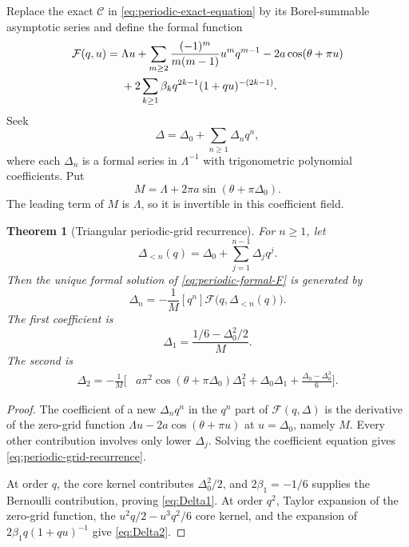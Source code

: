 \documentclass[11pt,a4paper,oneside]{article}
\theoremstyle{plain}
\newtheorem{theorem}{Theorem}[section]
\theoremstyle{definition}
\theoremstyle{remark}
\newcommand{\coeff}[2]{\left[#1^{#2}\right]}
\begin{document}
Replace the exact $\mathcal C$ in \cref{eq:periodic-exact-equation} by its
Borel-summable asymptotic series and define the formal function
\begin{align}
 \mathcal F(q,u)={}&\Lambda u+
 \sum_{m\ge2}\frac{(-1)^m}{m(m-1)}u^mq^{m-1}
 -2a\cos(\theta+\pi u)
 \notag\\
 &+2\sum_{k\ge1}\beta_kq^{2k-1}(1+qu)^{-(2k-1)}.
 \label{eq:periodic-formal-F}
\end{align}
Seek
\begin{equation}
 \Delta=\Delta_0+\sum_{n\ge1}\Delta_nq^n,
 \label{eq:periodic-q-expansion}
\end{equation}
where each $\Delta_n$ is a formal series in $\Lambda^{-1}$ with trigonometric
polynomial coefficients.  Put
\begin{equation}
 M=\Lambda+2\pi a\sin(\theta+\pi\Delta_0).
 \label{eq:periodic-M}
\end{equation}
The leading term of $M$ is $\Lambda$, so it is invertible in this coefficient
field.

\begin{theorem}[Triangular periodic-grid recurrence]
\label{thm:periodic-grid}
For $n\ge1$, let
\begin{equation}
 \Delta_{<n}(q)=\Delta_0+\sum_{j=1}^{n-1}\Delta_jq^j.
 \label{eq:Delta-less-n}
\end{equation}
Then the unique formal solution of \cref{eq:periodic-formal-F} is generated by
\begin{equation}
 \boxed{
 \Delta_n=-\frac1M\coeff{q}{n}
 \mathcal F\bigl(q,\Delta_{<n}(q)\bigr).}
 \label{eq:periodic-grid-recurrence}
\end{equation}
The first coefficient is
\begin{equation}
 \Delta_1=\frac{1/6-\Delta_0^2/2}{M}.
 \label{eq:Delta1}
\end{equation}
The second is
\begin{align}
 \Delta_2=-\frac1M\biggl[{}&
 a\pi^2\cos(\theta+\pi\Delta_0)\Delta_1^2
 +\Delta_0\Delta_1
 +\frac{\Delta_0-\Delta_0^3}{6}\biggr].
 \label{eq:Delta2}
\end{align}
\end{theorem}

\begin{proof}
The coefficient of a new $\Delta_nq^n$ in the $q^n$ part of
$\mathcal F(q,\Delta)$ is the derivative of the zero-grid function
$\Lambda u-2a\cos(\theta+\pi u)$ at $u=\Delta_0$, namely $M$.  Every other
contribution involves only lower $\Delta_j$.  Solving the coefficient equation
gives \cref{eq:periodic-grid-recurrence}.

At order $q$, the core kernel contributes $\Delta_0^2/2$, and
$2\beta_1=-1/6$ supplies the Bernoulli contribution, proving
\cref{eq:Delta1}.  At order $q^2$, Taylor expansion of the zero-grid function,
the $u^2q/2-u^3q^2/6$ core kernel, and the expansion of
$2\beta_1q(1+qu)^{-1}$ give \cref{eq:Delta2}.
\end{proof}
\end{document}
